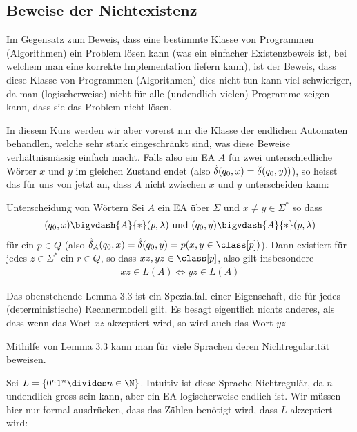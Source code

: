 \newpage
\subsection{Beweise der Nichtexistenz}
Im Gegensatz zum Beweis, dass eine bestimmte Klasse von Programmen (Algorithmen) ein Problem lösen kann
(was ein einfacher Existenzbeweis ist, bei welchem man eine korrekte Implementation liefern kann),
ist der Beweis, dass diese Klasse von Programmen (Algorithmen) dies nicht tun kann viel schwieriger,
da man (logischerweise) nicht für alle (undendlich vielen) Programme zeigen kann, dass sie das Problem nicht lösen.

In diesem Kurs werden wir aber vorerst nur die Klasse der endlichen Automaten behandlen, welche sehr stark eingeschränkt sind,
was diese Beweise verhältnismässig einfach macht.
Falls also ein EA $A$ für zwei unterschiedliche Wörter $x$ und $y$ im gleichen Zustand endet (also $\hat{\delta}(q_0, x) = \hat{\delta}(q_0, y))$),
so heisst das für uns von jetzt an, dass $A$ nicht zwischen $x$ und $y$ unterscheiden kann:

\begin{lemma}[]{Unterscheidung von Wörtern}
    Sei $A$ ein EA über $\Sigma$ und $x \neq y \in \Sigma^*$ so dass
    \begin{align*}
        (q_0, x) \bigvdash{A}{*} (p, \lambda) \text{ und } (q_0, y) \bigvdash{A}{*} (p, \lambda)
    \end{align*}
    für ein $p \in Q$ (also $\hdelta_A (q_0, x) = \hdelta(q_0, y) = p(x, y \in \class [p])$).
    Dann existiert für jedes $z \in \Sigma^*$ ein $r \in Q$, so dass $xz, yz \in \class[p]$, also gilt insbesondere
    \begin{align*}
        xz \in L(A) \Longleftrightarrow yz \in L(A)
    \end{align*}
\end{lemma}
Das obenstehende Lemma 3.3 ist ein Spezialfall einer Eigenschaft, die für jedes (deterministische) Rechnermodell gilt.
Es besagt eigentlich nichts anderes, als dass wenn das Wort $xz$ akzeptiert wird, so wird auch das Wort $yz$

Mithilfe von Lemma 3.3 kann man für viele Sprachen deren Nichtregularität beweisen.

\numberingOff
\inlineex Sei $L = \{ 0^n1^n \divides n \in \N \}$.
Intuitiv ist diese Sprache Nichtregulär, da $n$ undendlich gross sein kann, aber ein EA logischerweise endlich ist.
Wir müssen hier nur formal ausdrücken, dass das Zählen benötigt wird, dass $L$ akzeptiert wird:

